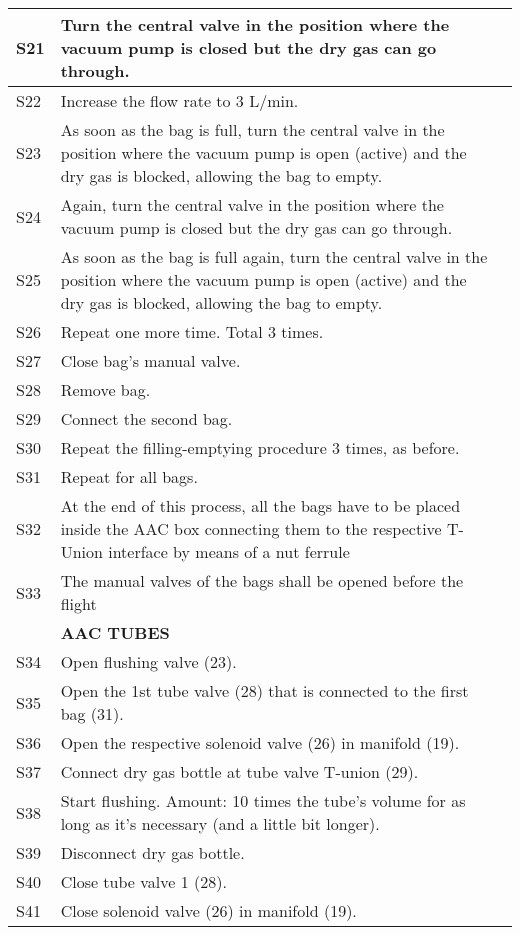\begin{longtable} {|m{}|m{}|m{}|}
\hline
S21 & Turn the central valve in the position where the vacuum pump is closed but the dry gas can go through. & \\
\hline
S22 & Increase the flow rate to 3 L/min. & \\
\hline
S23 & As soon as the bag is full, turn the central valve in the position where the vacuum pump is open (active) and the dry gas is blocked, allowing the bag to empty. & \\
\hline
S24 & Again, turn the central valve in the position where the vacuum pump is closed but the dry gas can go through. & \\
\hline
S25 & As soon as the bag is full again, turn the central valve in the position where the vacuum pump is open (active) and the dry gas is blocked, allowing the bag to empty. & \\
\hline
S26 & Repeat one more time. Total 3 times. & \\
\hline
S27 & Close bag's manual valve. & \\
\hline
S28 & Remove bag. & \\
\hline
S29 & Connect the second bag. & \\
\hline
S30 & Repeat the filling-emptying procedure 3 times, as before. & \\
\hline
S31 & Repeat for all bags. & \\
\hline
S32 & At the end of this process, all the bags have to be placed inside the AAC box connecting them to the respective T-Union interface by means of a nut ferrule & \\
\hline
S33 & The manual valves of the bags shall be opened before the flight & \\
\hline
& \textbf{AAC TUBES} & \\
\hline
S34 & Open flushing valve (23). & \\
\hline
S35 & Open the 1st tube valve (28) that is connected to the first bag (31). & \\
\hline
S36 & Open the respective solenoid valve (26) in manifold (19). & \\
\hline
S37 & Connect dry gas bottle at tube valve T-union (29). & \\
\hline
S38 & Start flushing. Amount: 10 times the tube's volume for as long as it's necessary (and a little bit longer). & \\
\hline
S39 & Disconnect dry gas bottle. & \\
\hline
S40 & Close tube valve 1 (28). & \\
\hline
S41 & Close solenoid valve (26) in manifold (19). & \\

\end{longtable}
